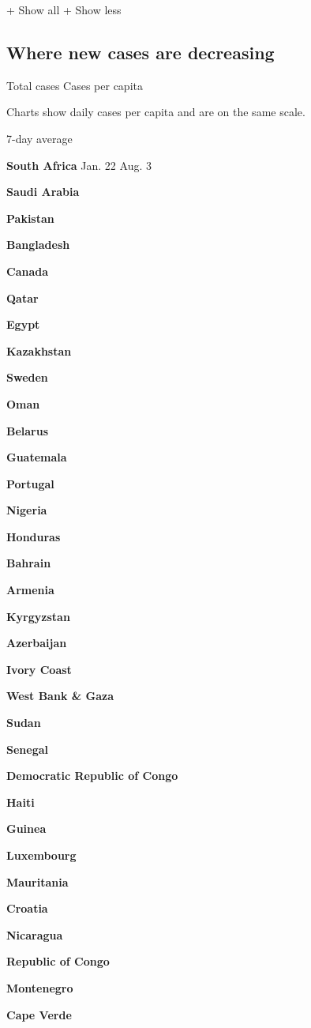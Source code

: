 + Show all + Show less

\hypertarget{where-new-cases-are-decreasing}{%
\subsection{Where new cases are
decreasing}\label{where-new-cases-are-decreasing}}

Total cases Cases per capita

Charts show daily cases per capita and are on the same scale.

7-day average

\textbf{South Africa} Jan. 22 Aug. 3

\textbf{Saudi Arabia}

\textbf{Pakistan}

\textbf{Bangladesh}

\textbf{Canada}

\textbf{Qatar}

\textbf{Egypt}

\textbf{Kazakhstan}

\textbf{Sweden}

\textbf{Oman}

\textbf{Belarus}

\textbf{Guatemala}

\textbf{Portugal}

\textbf{Nigeria}

\textbf{Honduras}

\textbf{Bahrain}

\textbf{Armenia}

\textbf{Kyrgyzstan}

\textbf{Azerbaijan}

\textbf{Ivory Coast}

\textbf{West Bank \& Gaza}

\textbf{Sudan}

\textbf{Senegal}

\textbf{Democratic Republic of Congo}

\textbf{Haiti}

\textbf{Guinea}

\textbf{Luxembourg}

\textbf{Mauritania}

\textbf{Croatia}

\textbf{Nicaragua}

\textbf{Republic of Congo}

\textbf{Montenegro}

\textbf{Cape Verde}

